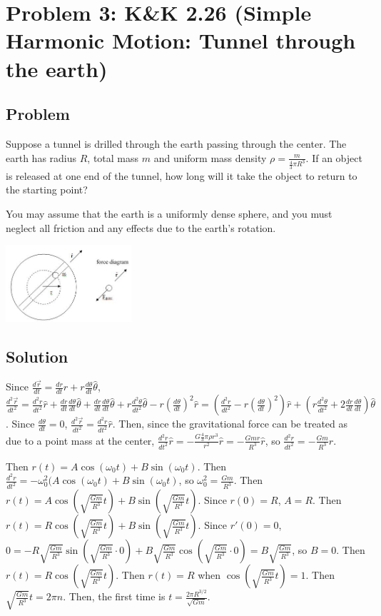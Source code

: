 \documentclass[solutions]{esg8012pset}
\begin{document}
\section*{Problem 3: K\&K 2.26 (Simple Harmonic Motion: Tunnel through the earth)}
\subsection*{Problem}
  Suppose a tunnel is drilled through the earth passing through the center. The earth has radius $R$, total mass $m$ and uniform mass density $\rho = \frac{m}{\frac{4}{3}\pi R^3}$.  If an object is released at one end of the tunnel, how long will it take the object to return to the starting point?

  You may assume that the earth is a uniformly dense sphere, and you must neglect all friction and any effects due to the earth's rotation.
  \begin{center}\includegraphics[width=0.35\textwidth]{ps03_2}\end{center}
\subsection*{Solution}
  Since $\frac{d \vec r}{d t} = \frac{d r}{d t}\hat r + r\frac{d \theta}{d t}\hat\theta$, $\frac{d^2 \vec r}{d t^2} = \frac{d^2 r}{d t^2}\hat r + \frac{d r}{d t}\frac{d \theta}{d t}\hat \theta + \frac{d r}{d t}\frac{d \theta}{d t}\hat\theta + r\frac{d^2 \theta}{d t^2}\hat\theta - r\left(\frac{d \theta}{d t}\right)^2\hat r = \left(\frac{d^2 r}{d t^2}- r\left(\frac{d \theta}{d t}\right)^2\right)\hat r + \left(r\frac{d^2 \theta}{d t^2} + 2\frac{d r}{d t}\frac{d \theta}{d t}\right)\hat \theta$.  Since $\frac{d \theta}{d t} = 0$, $\frac{d^2 \vec r}{d t^2} =  \frac{d^2 r}{d t^2}\hat r$.  Then, since the gravitational force can be treated as due to a point mass at the center, $\frac{d^2 r}{d t^2}\hat r = -\frac{G \frac{4}{3}\pi \rho r^3}{r^2} \hat r = -\frac{G m r}{R^3} \hat r$, so $\frac{d^2 r}{d t^2} = -\frac{G m}{R^3}r$.

  Then $r(t) = A\cos(\omega_0 t) + B\sin(\omega_0 t)$.  Then $\frac{d^2 r}{d t^2} = -\omega_0^2(A\cos(\omega_0 t) + B\sin(\omega_0 t)$, so $\omega_0^2 = \frac{G m}{R^3}$.  Then $r(t) = A\cos\left(\sqrt{\frac{G m}{R^3}} t\right) + B\sin\left(\sqrt{\frac{G m}{R^3}} t\right)$.  Since $r(0) = R$, $A = R$.  Then $r(t) = R\cos\left(\sqrt{\frac{G m}{R^3}} t\right) + B\sin\left(\sqrt{\frac{G m}{R^3}} t\right)$.  Since $r'(0) = 0$, $0 = -R\sqrt{\frac{G m}{R^3}}\sin\left(\sqrt{\frac{G m}{R^3}} \cdot 0\right) + B\sqrt{\frac{G m}{R^3}}\cos\left(\sqrt{\frac{G m}{R^3}} \cdot 0\right) = B\sqrt{\frac{G m}{R^3}}$, so $B = 0$.  Then $r(t) = R\cos\left(\sqrt{\frac{G m}{R^3}} t\right)$.  Then $r(t) = R$ when $\cos\left(\sqrt{\frac{G m}{R^3}} t\right) = 1$.  Then $\sqrt{\frac{G m}{R^3}} t = 2\pi n$.  Then, the first time is $t = \frac{2\pi R^{3/2}}{\sqrt{G m}}$.
\end{document}
